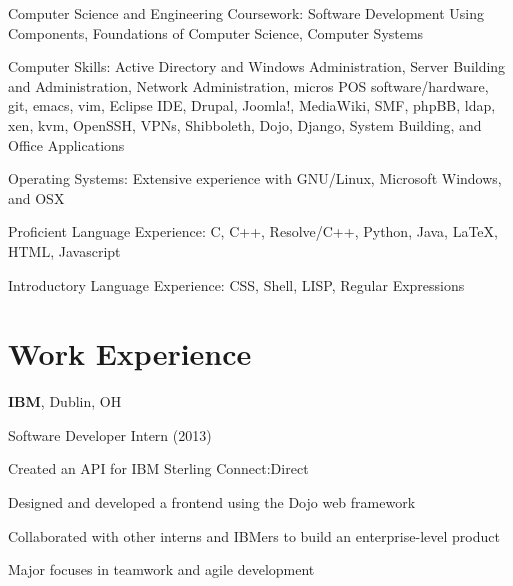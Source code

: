 \documentclass[letterpaper]{resume}
\begin{document}
\begin{compactitem}
	\item Computer Science and Engineering Coursework: Software Development Using Components, Foundations of Computer Science, Computer Systems

	\item Computer Skills: Active Directory and Windows Administration, Server Building and Administration, Network Administration, micros POS software/hardware, git, emacs, vim, Eclipse IDE, Drupal, Joomla!, MediaWiki, SMF, phpBB, ldap, xen, kvm, OpenSSH, VPNs, Shibboleth, Dojo, Django, System Building, and Office Applications

	\item Operating Systems: Extensive experience with GNU/Linux, Microsoft Windows, and OSX

	\item Proficient Language Experience: C, C++, Resolve/C++, Python, Java, \LaTeX, HTML, Javascript
	\item Introductory Language Experience: CSS, Shell, LISP, Regular Expressions

\end{compactitem}


\section{Work Experience}
\textbf{IBM}, Dublin, OH

Software Developer Intern (2013)
\begin{compactitem}
	\item Created an API for IBM Sterling Connect:Direct

	\item Designed and developed a frontend using the Dojo web framework

	\item Collaborated with other interns and IBMers to build an enterprise-level product

	\item Major focuses in teamwork and agile development
\end{compactitem}

~

%
%
\end{document}
